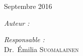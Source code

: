 \begin{titlepage}
\begin{center}
		{\large Septembre 2016}		
		\vfill
		\begin{minipage}[t]{0.48\textwidth}
			\begin{flushleft}
				\emph{Auteur :}\\
				\reportauthor
			\end{flushleft}
		\end{minipage}
		\begin{minipage}[t]{0.48\textwidth}
			\begin{flushright}
				\emph{Responsable :} \\
				Dr.~\'Emilia \textsc{Suomalainen}
			\end{flushright}
		\end{minipage}
	\end{center}
\end{titlepage}
